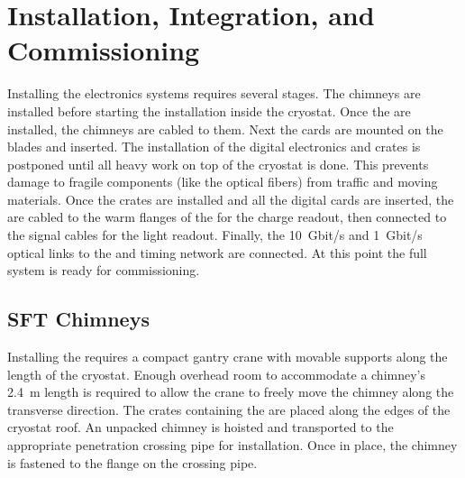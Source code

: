 \section{Installation, Integration, and Commissioning}
\label{sec:dp-tpcelec-install}

Installing the  electronics systems requires several stages. %
The chimneys are installed before starting the  installation inside the cryostat. Once the  are installed, the chimneys are cabled to them.  
Next the  cards are mounted on the blades and inserted. The installation of the digital electronics and  crates is postponed until all heavy work on top of the cryostat is done. This prevents damage to fragile components (like the optical fibers) from traffic and moving materials. 
Once the  crates are installed and all the digital cards are inserted, the  are cabled to the warm flanges of the  for the charge readout, then %
connected to the  signal cables for the light readout. Finally, %
the \SI{10}{Gbit/s} and \SI{1}{Gbit/s} optical links to the  and  timing network are connected. At this point %
the full system is ready for commissioning. 

\subsection{SFT Chimneys}
\label{sec:dp-tpcelec-install-sft}

Installing the  requires a compact gantry crane with movable supports along the length of the cryostat. %
Enough overhead room to accommodate a chimney's \SI{2.4}{m} length is required to allow the crane to freely move the chimney along the transverse direction. The crates containing the  are placed along the edges of the cryostat roof. An unpacked chimney is hoisted and transported to the appropriate penetration crossing pipe for installation. Once in place, the chimney is fastened to the flange on the crossing pipe. %

